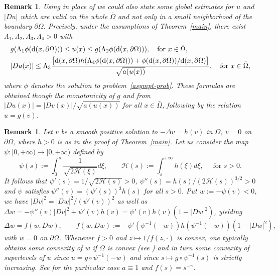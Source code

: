 \documentclass[10pt]{amsart}
\numberwithin{equation}{section}
\newtheorem{remark}[theorem]{Remark}
\theoremstyle{definition}
\begin{document}
\begin{remark}\rm
\label{globalrem}
Using \cite[Theorem 1.3]{zhangcheng} in place of \cite[Theorem 2.2 and Theorem 2.5]{craRabTar} we could also
state some global estimates for $u$ and $|Du|$ which are valid on the whole $\bar\Omega$ and not only in a small neighborhood
of the boundary $\partial\Omega$. Precisely, under the assumptions of Theorem~\ref{main}, 
there exist $\Lambda_1,\Lambda_2,\Lambda_3,\Lambda_4>0$ with
\begin{align*}
 & g(\Lambda_1 \phi({\rm d}(x,\partial\Omega)))\leq 
u(x)\leq  g(\Lambda_2 \phi({\rm d}(x,\partial\Omega))), \,\,\,\,\,\,\text{for $x\in\bar\Omega,$}\\
& |Du(x)|\leq \Lambda_3\frac{\big[{\rm d}(x,\partial\Omega)h(\Lambda_4\phi({\rm d}
(x,\partial\Omega)))+\phi({\rm d}(x,\partial\Omega))/{\rm d}(x,\partial\Omega)\big]}{\sqrt{a(u(x))}},
\,\,\,\,\,\,\text{for $x\in\bar\Omega,$}
\end{align*}
where $\phi$ denotes the solution to problem~\eqref{asympt-prob}. These formulas
are obtained though the monotonicity of $g$ and from $|Du(x)|=|Dv(x)|/\sqrt{a(u(x))}$ for all $x\in\bar\Omega$,
following by the relation $u=g(v)$.
\end{remark}

\begin{remark}\rm 
	\label{convexity}
Let $v$ be a smooth positive solution to 
$-\Delta v=h(v)$ in $\Omega$, $v=0$ on $\partial\Omega$,
	where $h>0$ is as in the proof of Theorem~\ref{main}. 
	Let us consider the map $\psi:[0,+\infty)\to [0,+\infty)$ defined by
	$$
	\psi(s):=\int_0^s \frac{1}{\sqrt{2{\mathcal H}(\xi)}}d\xi,\qquad
	{\mathcal H}(s):=\int_s^{+\infty} h(\xi)d\xi,
	\,\,\quad\text{for $s>0$.}
	$$
	It follows that $\psi'(s)=1/{\sqrt{2{\mathcal H}(s)}}>0$,
	$\psi''(s)={h(s)}/{(2{\mathcal H}(s))^{3/2}}>0$
	and $\psi$ satisfies $\psi''(s)=(\psi'(s))^3 h(s)$ for all $s>0$.
	Put $w:=-\psi(v)<0$, we have $|Dv|^2=|Dw|^2/(\psi'(v))^2$ as well as
	$\Delta w =-\psi''(v)|Dv|^2+\psi'(v)h(v)=\psi'(v) h(v)(1-|Dw|^2)$, yielding
	\begin{equation*}
	\Delta w=f(w,Dw),\qquad  f(w,Dw):=-\psi'(\psi^{-1}(-w)) h(\psi^{-1}(-w))(1-|Dw|^2),
	\end{equation*}
	with $w=0$ on $\partial\Omega$. Whenever $f>0$ and $z\mapsto 1/f(z,\cdot)$ is convex, one typically
	obtains some convexity of $w$ if $\Omega$ is convex (see \cite{kawohl}) and in turn some 
	convexity of superlevels of $u$ since $u=g\circ\psi^{-1}(-w)$ and since 
	$s\mapsto g\circ\psi^{-1}(s)$ is strictly increasing. See \cite[Sec.\ 3]{frapor}
	for the particular case $a\equiv 1$ and $f(s)=s^{-\gamma}$.
	\end{remark}
\end{document}
